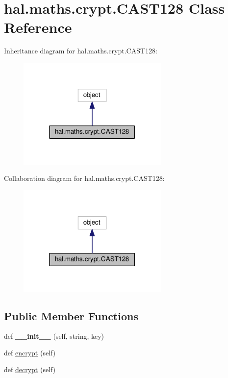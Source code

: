 \hypertarget{classhal_1_1maths_1_1crypt_1_1_c_a_s_t128}{}\section{hal.\+maths.\+crypt.\+C\+A\+S\+T128 Class Reference}
\label{classhal_1_1maths_1_1crypt_1_1_c_a_s_t128}


Inheritance diagram for hal.\+maths.\+crypt.\+C\+A\+S\+T128\+:\nopagebreak
\begin{figure}[H]
\begin{center}
\leavevmode
\includegraphics[width=210pt]{classhal_1_1maths_1_1crypt_1_1_c_a_s_t128__inherit__graph}
\end{center}
\end{figure}


Collaboration diagram for hal.\+maths.\+crypt.\+C\+A\+S\+T128\+:\nopagebreak
\begin{figure}[H]
\begin{center}
\leavevmode
\includegraphics[width=210pt]{classhal_1_1maths_1_1crypt_1_1_c_a_s_t128__coll__graph}
\end{center}
\end{figure}
\subsection*{Public Member Functions}
\begin{DoxyCompactItemize}
\item 
def {\bfseries \+\_\+\+\_\+init\+\_\+\+\_\+} (self, string, key)\hypertarget{classhal_1_1maths_1_1crypt_1_1_c_a_s_t128_a285a3b0d8e5ab5a6aa1bfe2ed07cf275}{}\label{classhal_1_1maths_1_1crypt_1_1_c_a_s_t128_a285a3b0d8e5ab5a6aa1bfe2ed07cf275}

\item 
def \hyperlink{classhal_1_1maths_1_1crypt_1_1_c_a_s_t128_a955fa0eab07e305ba028b007c2851abf}{encrypt} (self)
\item 
def \hyperlink{classhal_1_1maths_1_1crypt_1_1_c_a_s_t128_a70b29321e653c2daaeb2c9e144d2c1c0}{decrypt} (self)
\end{DoxyCompactItemize}
